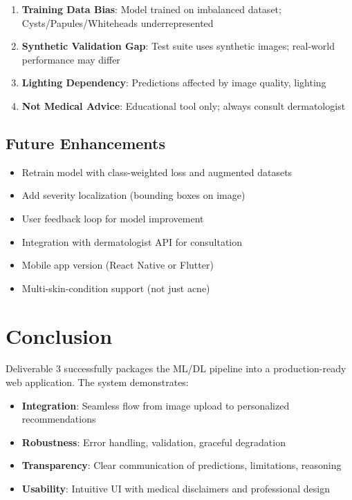 \documentclass[12pt,a4paper]{article}
\begin{document}
\begin{enumerate}
    \item \textbf{Training Data Bias}: Model trained on imbalanced dataset; Cysts/Papules/Whiteheads underrepresented
    \item \textbf{Synthetic Validation Gap}: Test suite uses synthetic images; real-world performance may differ
    \item \textbf{Lighting Dependency}: Predictions affected by image quality, lighting
    \item \textbf{Not Medical Advice}: Educational tool only; always consult dermatologist
\end{enumerate}

\subsection{Future Enhancements}

\begin{itemize}
    \item Retrain model with class-weighted loss and augmented datasets
    \item Add severity localization (bounding boxes on image)
    \item User feedback loop for model improvement
    \item Integration with dermatologist API for consultation
    \item Mobile app version (React Native or Flutter)
    \item Multi-skin-condition support (not just acne)
\end{itemize}

\section{Conclusion}

Deliverable 3 successfully packages the ML/DL pipeline into a production-ready web application. The system demonstrates:

\begin{itemize}
    \item \textbf{Integration}: Seamless flow from image upload to personalized recommendations
    \item \textbf{Robustness}: Error handling, validation, graceful degradation
    \item \textbf{Transparency}: Clear communication of predictions, limitations, reasoning
    \item \textbf{Usability}: Intuitive UI with medical disclaimers and professional design
\end{itemize}
\end{document}
